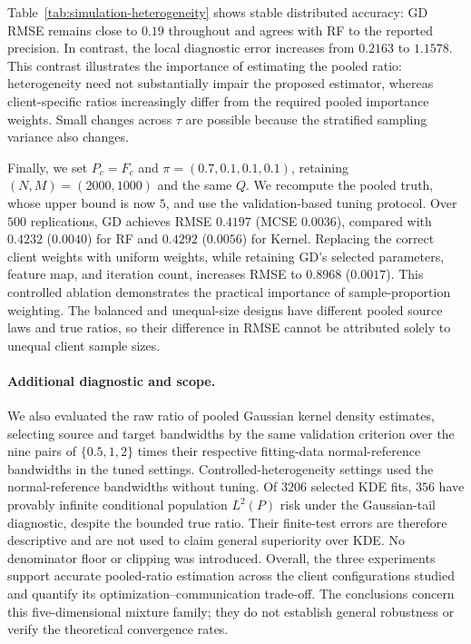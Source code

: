 Table~\ref{tab:simulation-heterogeneity} shows stable distributed accuracy:
GD RMSE remains close to $0.19$ throughout and agrees with RF to the
reported precision. In contrast, the local diagnostic error increases
from $0.2163$ to $1.1578$. This contrast illustrates the importance of
estimating the pooled ratio: heterogeneity need not substantially impair
the proposed estimator, whereas client-specific ratios increasingly differ
from the required pooled importance weights. Small changes across $\tau$
are possible because the stratified sampling variance also changes.

Finally, we set $P_c=F_c$ and
$\pi=(0.7,0.1,0.1,0.1)$, retaining $(N,M)=(2000,1000)$ and the same $Q$.
We recompute the pooled truth, whose upper bound is now $5$, and use the
validation-based tuning protocol. Over $500$ replications, GD achieves
RMSE $0.4197$ (MCSE $0.0036$), compared with $0.4232$ ($0.0040$) for RF
and $0.4292$ ($0.0056$) for Kernel. Replacing the correct client weights
with uniform weights, while retaining GD's selected parameters, feature
map, and iteration count, increases RMSE to $0.8968$ ($0.0017$).
This controlled ablation demonstrates the practical importance of
sample-proportion weighting. The balanced and unequal-size designs have
different pooled source laws and true ratios, so their difference in RMSE
cannot be attributed solely to unequal client sample sizes.

\paragraph{Additional diagnostic and scope.}
We also evaluated the raw ratio of pooled Gaussian kernel density estimates,
selecting source and target bandwidths by the same validation criterion over
the nine pairs of $\{0.5,1,2\}$ times their respective fitting-data
normal-reference bandwidths in the tuned settings. Controlled-heterogeneity
settings used the normal-reference bandwidths without tuning. Of $3206$
selected KDE fits, $356$ have provably infinite conditional population
$L^2(P)$ risk under the Gaussian-tail diagnostic, despite the bounded true
ratio. Their finite-test errors are therefore descriptive and are not used
to claim general superiority over KDE. No denominator floor or clipping
was introduced. Overall, the three experiments support accurate pooled-ratio
estimation across the client configurations studied and quantify its
optimization--communication trade-off. The conclusions concern this
five-dimensional mixture family; they do not establish general robustness
or verify the theoretical convergence rates.
